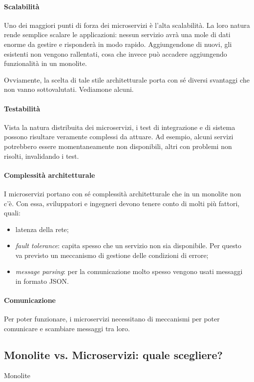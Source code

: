 \paragraph*{Scalabilità} Uno dei maggiori punti di forza dei microservizi è l'alta scalabilità. La loro natura rende semplice scalare le
applicazioni: nessun servizio avrà una mole di dati enorme da gestire e risponderà in modo rapido. Aggiungendone di nuovi, gli esistenti non vengono rallentati, cosa che invece può accadere aggiungendo funzionalità in un monolite.

\bigskip

Ovviamente, la scelta di tale stile architetturale porta con sé diversi svantaggi che non vanno sottovalutati. Vediamone alcuni.

\paragraph*{Testabilità} Vista la natura distribuita dei microservizi, i test di integrazione e di sistema possono risultare veramente complessi
da attuare. Ad esempio, alcuni servizi potrebbero essere momentaneamente non disponibili, altri con problemi non risolti, invalidando i test.

\paragraph*{Complessità architetturale} I microservizi portano con sé complessità architetturale che in un monolite non c'è.
Con essa, sviluppatori e ingegneri devono tenere conto di molti più fattori, quali:
\begin{itemize}
	\item latenza della rete;
	\item \textit{fault tolerance}: capita spesso che un servizio non sia disponibile. Per questo va previsto un meccanismo di gestione delle
	condizioni di errore;
	\item \textit{message parsing}: per la comunicazione molto spesso vengono usati messaggi in formato JSON.
\end{itemize}

\paragraph*{Comunicazione} Per poter funzionare, i microservizi necessitano di meccanismi per poter comunicare e scambiare messaggi tra loro.

\subsection{Monolite vs. Microservizi: quale scegliere?}
Monolite


